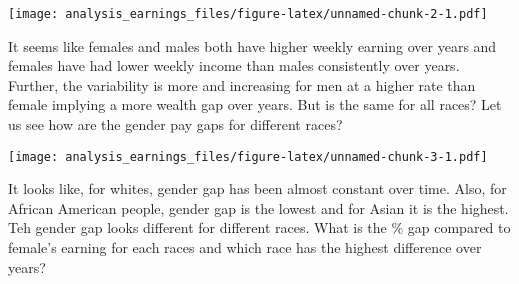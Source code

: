 \documentclass[
]{article}
\newenvironment{Shaded}{\begin{snugshade}}{\end{snugshade}}
\newcommand{\DataTypeTok}[1]{\textcolor[rgb]{0.13,0.29,0.53}{#1}}
\newcommand{\KeywordTok}[1]{\textcolor[rgb]{0.13,0.29,0.53}{\textbf{#1}}}
\newcommand{\NormalTok}[1]{#1}
\newcommand{\OperatorTok}[1]{\textcolor[rgb]{0.81,0.36,0.00}{\textbf{#1}}}
\newcommand{\StringTok}[1]{\textcolor[rgb]{0.31,0.60,0.02}{#1}}
\begin{document}
\texttt{[image: analysis\_earnings\_files/figure-latex/unnamed-chunk-2-1.pdf]}

It seems like females and males both have higher weekly earning over
years and females have had lower weekly income than males consistently
over years. Further, the variability is more and increasing for men at a
higher rate than female implying a more wealth gap over years. But is
the same for all races? Let us see how are the gender pay gaps for
different races?

\begin{Shaded}
\end{Shaded}

\texttt{[image: analysis\_earnings\_files/figure-latex/unnamed-chunk-3-1.pdf]}

It looks like, for whites, gender gap has been almost constant over
time. Also, for African American people, gender gap is the lowest and
for Asian it is the highest. Teh gender gap looks different for
different races. What is the \% gap compared to female's earning for
each races and which race has the highest difference over years?
\end{document}
